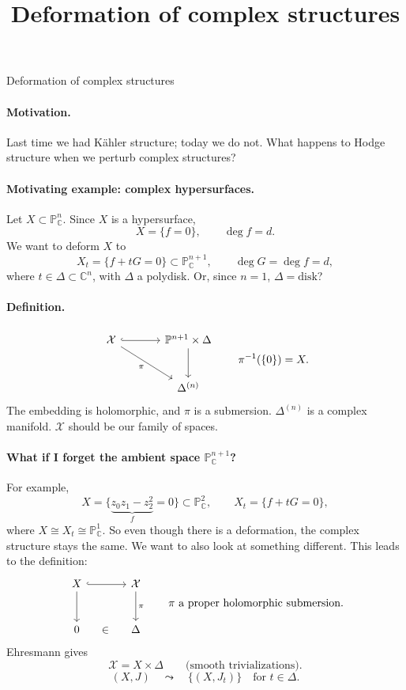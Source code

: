 \documentclass[11pt]{article}
\title{Deformation of complex structures}
\author{}
\date{}
\newcommand{\C}{\mathbb C}
\newcommand{\PP}{\mathbb P}
\newcommand{\XX}{\mathcal X}
\begin{document}
\begin{center}
{\Large Deformation of complex structures}
\end{center}

\paragraph{Motivation.}
Last time we had K\"ahler structure; today we do not.
What happens to Hodge structure when we perturb complex structures?

\paragraph{Motivating example: complex hypersurfaces.}
Let $X\subset\PP^n_{\C}$. Since $X$ is a hypersurface,
\[
 X=\{f=0\},\qquad \deg f=d.
\]
We want to deform $X$ to
\[
 X_t=\{f+tG=0\}\subset\PP^{n+1}_{\C},
 \qquad \deg G=\deg f=d,
\]
where $t\in\Delta\subset\C^n$, with $\Delta$ a polydisk.
Or, since $n=1$, $\Delta=\text{disk}$?

\paragraph{Definition.}
\[
\begin{tikzcd}[column sep=large,row sep=large]
 \XX \arrow[r,hook]
     \arrow[dr,"\pi"']
 & \PP^{n+1}\times\Delta \arrow[d]\\
 & \Delta^{(n)}
\end{tikzcd}
\qquad \pi^{-1}(\{0\})=X.
\]
The embedding is holomorphic, and $\pi$ is a submersion.
$\Delta^{(n)}$ is a complex manifold.
$\XX$ should be our family of spaces.

\paragraph{What if I forget the ambient space $\PP^{n+1}_{\C}$?}
For example,
\[
 X=\{\underbrace{z_0z_1-z_2^2}_{f}=0\}\subset\PP^2_{\C},
 \qquad X_t=\{f+tG=0\},
\]
where $X\cong X_t\cong\PP^1_{\C}$.
So even though there is a deformation, the complex structure stays the
same. We want to also look at something different. This leads to the
definition:
\[
\begin{tikzcd}[column sep=large,row sep=large]
 X \arrow[r,hook] \arrow[d] & \XX \arrow[d,"\pi"]\\
 0 \arrow[r,phantom,"\in"] & \Delta
\end{tikzcd}
\qquad \pi\text{ a proper holomorphic submersion}.
\]
Ehresmann gives
\[
 \XX=X\times\Delta\qquad\text{(smooth trivializations)}.
\]
\[
 (X,J)\quad\leadsto\quad\{(X,J_t)\}\quad\text{for }t\in\Delta.
\]
\end{document}
